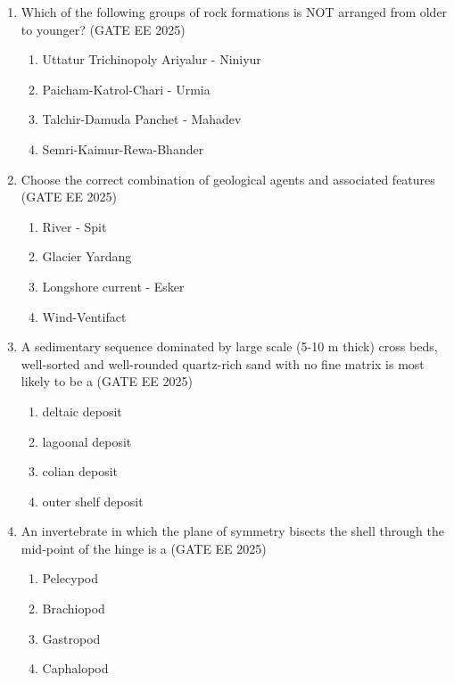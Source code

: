 \documentclass[journal]{IEEEtran}
\begin{document}
\begin{enumerate}[start=1]
\item Which of the following groups of rock formations is NOT arranged from older to younger?
\hfill{(GATE EE 2025)}\\
\begin{enumerate}
    \item Uttatur Trichinopoly Ariyalur - Niniyur
    \item Paicham-Katrol-Chari - Urmia
    \item Talchir-Damuda Panchet - Mahadev
    \item Semri-Kaimur-Rewa-Bhander
\end{enumerate}

\item Choose the correct combination of geological agents and associated features\\
\hfill{(GATE EE 2025)}\\
\begin{enumerate}
    \item River - Spit
    \item Glacier Yardang
    \item Longshore current - Esker
    \item Wind-Ventifact
\end{enumerate}

\item A sedimentary sequence dominated by large scale (5-10 m thick) cross beds, well-sorted and well-rounded quartz-rich sand with no fine matrix is most likely to be a
\hfill{(GATE EE 2025)}\\
\begin{enumerate}
    \item deltaic deposit
    \item lagoonal deposit
    \item colian deposit
    \item outer shelf deposit
\end{enumerate}

\item An invertebrate in which the plane of symmetry bisects the shell through the mid-point of the hinge is a
\hfill{(GATE EE 2025)}\\
\begin{enumerate}
    \item Pelecypod
    \item Brachiopod
    \item Gastropod
    \item Caphalopod
\end{enumerate}


\end{enumerate}
\end{document}
